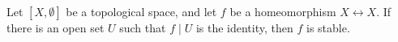 Let $[X, \emptyset]$ be a topological space, and let $f$ be a homeomorphism $X \leftrightarrow X$. If there is an open set $U$ such that $f \mid U$ is the identity, then $f$ is stable.
